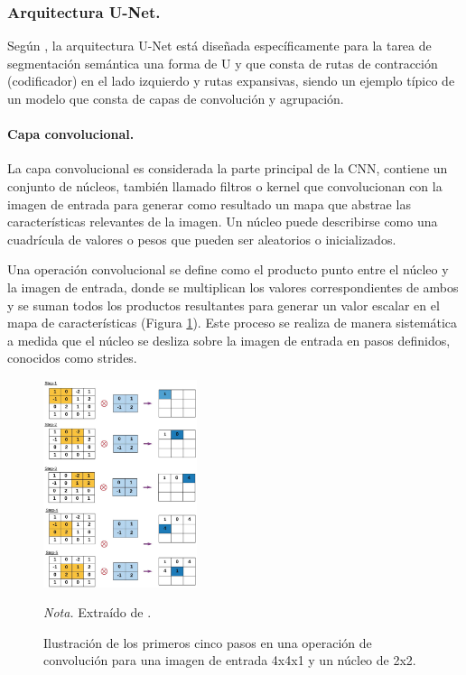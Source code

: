 \subsubsection{Arquitectura U-Net.}
Según \citet{al_dabbagh_2023}, la arquitectura U-Net está diseñada específicamente para la tarea de segmentación semántica una forma de U y que consta de rutas de contracción (codificador) en el lado izquierdo y rutas expansivas,
siendo un ejemplo típico de un modelo que consta de capas de convolución y agrupación.

\paragraph{Capa convolucional.}
La capa convolucional es considerada la parte principal de la CNN, contiene un conjunto de núcleos, también llamado filtros o kernel que convolucionan con la imagen de entrada  
para generar como resultado un mapa que abstrae las características relevantes de la imagen. Un núcleo puede describirse como una cuadrícula de valores o pesos que pueden ser aleatorios 
o inicializados.

Una operación convolucional se define como el producto punto entre el núcleo y la imagen de entrada, donde se multiplican los valores correspondientes de ambos y se suman todos los productos resultantes 
para generar un valor escalar en el mapa de características (Figura \ref{fig:convolutional_layer}). Este proceso se realiza de manera sistemática a medida que el núcleo se desliza sobre la imagen de entrada en pasos definidos, conocidos 
como strides.

\begin{figure}[H]
    \centering
    \caption{Ilustración de los primeros cinco pasos en una operación de convolución para una imagen de entrada 4x4x1 y un núcleo de 2x2.}
    \includegraphics[width=0.4\textwidth]{img/4_marco_teorico/convolutional_layer.png}
    \label{fig:convolutional_layer}
    \begin{flushleft}
        \textit{Nota.} Extraído de \citet{balas_recent_2020}. 
        \vspace{-\baselineskip}       
    \end{flushleft}
\end{figure}

